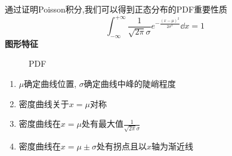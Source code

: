 通过证明Poisson积分,我们可以得到正态分布的PDF重要性质
\begin{equation}
    \int_{-\infty}^{+\infty}\frac{1}{\sqrt{2\pi}\sigma}e^{-\frac{(x-\mu)^2}{2\sigma^2}}\dd x = 1
\end{equation}
\newpage
\textbf{图形特征}
\begin{figure}[h]
    \centering
    
    \caption{PDF}
\end{figure}
\begin{enumerate}
    \item $\mu$确定曲线位置, $\sigma$确定曲线中峰的陡峭程度
    \item 密度曲线关于$x=\mu$对称
    \item 密度曲线在$x=\mu$处有最大值$\frac{1}{\sqrt{2\pi}\sigma}$
    \item 密度曲线在$x=\mu\pm\sigma$处有拐点且以$x$轴为渐近线
\end{enumerate}
